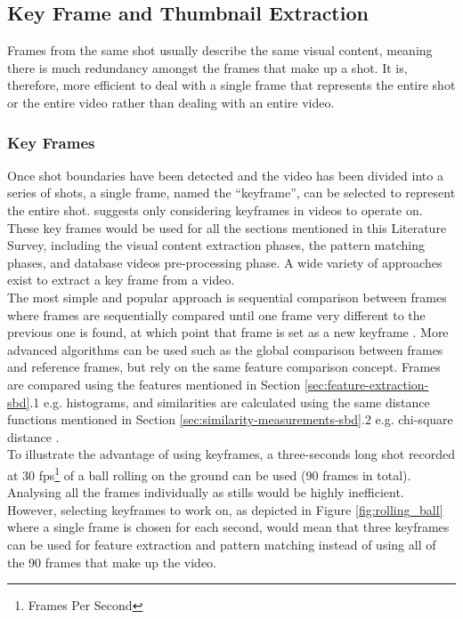 
\subsection{Key Frame and Thumbnail Extraction}

Frames from the same shot usually describe the same visual content, meaning there is much redundancy amongst the frames that make up a shot. It is, therefore, more efficient to deal with a single frame that represents the entire shot or the entire video rather than dealing with an entire video.

\subsubsection{Key Frames}

Once shot boundaries have been detected and the video has been divided into a series of shots, a single frame, named the ``keyframe'', can be selected to represent the entire shot. \cite{heo2016colortransfer} suggests only considering keyframes in videos to operate on. These key frames would be used for all the sections mentioned in this Literature Survey, including the visual content extraction phases, the pattern matching phases, and database videos pre-processing phase. A wide variety of approaches exist to extract a key frame from a video.\\

The most simple and popular approach is sequential comparison between frames where frames are sequentially compared until one frame very different to the previous one is found, at which point that frame is set as a new keyframe \cite{heo2016colortransfer}. More advanced algorithms can be used such as the global comparison between frames and reference frames, but rely on the same feature comparison concept. Frames are compared using the features mentioned in Section \ref{sec:feature-extraction-sbd}.1 e.g. histograms, and similarities are calculated using the same distance functions mentioned in Section \ref{sec:similarity-measurements-sbd}.2 e.g. chi-square distance \cite{hu2011survey}.\\

To illustrate the advantage of using keyframes, a three-seconds long shot recorded at 30 fps\footnote{Frames Per Second} of a ball rolling on the ground can be used (90 frames in total). Analysing all the frames individually as stills would be highly inefficient. However, selecting keyframes to work on, as depicted in Figure \ref{fig:rolling_ball} where a single frame is chosen for each second, would mean that three keyframes can be used for feature extraction and pattern matching instead of using all of the 90 frames that make up the video.\\


